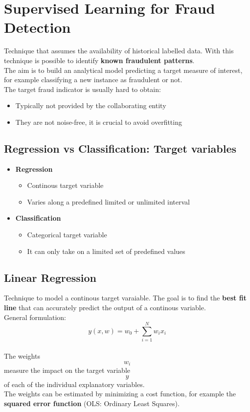 \section{Supervised Learning for Fraud Detection}
    Technique that assumes the availability of historical labelled data. With this technique is possible to identify \textbf{known fraudulent patterns}.\\
    The aim is to build an analytical model predicting a target measure of interest, for example classifying a new instance as fraudulent or not.\\
    The target fraud indicator is usually hard to obtain:
    \begin{itemize}
        \item Typically not provided by the collaborating entity
        \item They are not noise-free, it is crucial to avoid overfitting
    \end{itemize}
    \subsection{Regression vs Classification: Target variables}
    \begin{itemize}
        \item \textbf{Regression}
        \begin{itemize}
            \item Continous target variable
            \item Varies along a predefined limited or unlimited interval 
        \end{itemize}
        \item \textbf{Classification}
        \begin{itemize}
            \item Categorical target variable 
            \item It can only take on a limited set of predefined values
        \end{itemize}
    \end{itemize}
    \subsection{Linear Regression}
        Technique to model a continous target varaiable. The goal is to find the \textbf{best fit line} that can accurately predict the output of a continous variable.\\ 
        General formulation:\\
        \centering $$y(x,w) = w_0 + \sum_{i=1}^{N}w_ix_i$$\\
        The weights $$w_i$$ measure the impact on the target variable $$y$$ of each of the individual explanatory variables.\\
        The weights can be estimated by minimizing a cost function, for example the \textbf{squared error function} (OLS: Ordinary Least Squares).\\
